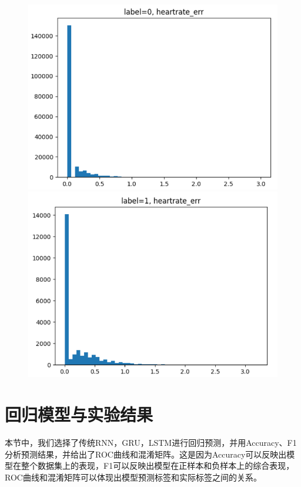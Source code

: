 \documentclass[UTF8]{article}
\begin{document}
\begin{figure}[h]
    \centering
    \begin{minipage}{.43\linewidth}
        \centering
        \includegraphics[width=\linewidth]{../err_0.png}
    \end{minipage}
    \begin{minipage}{.43\linewidth}
        \centering
        \includegraphics[width=\linewidth]{../err_1.png}
    \end{minipage}
\end{figure}

\section{回归模型与实验结果}
本节中，我们选择了传统RNN，GRU，LSTM进行回归预测，并用Accuracy、F1分析预测结果，并给出了ROC曲线和混淆矩阵。这是因为Accuracy可以反映出模型在整个数据集上的表现，F1可以反映出模型在正样本和负样本上的综合表现，ROC曲线和混淆矩阵可以体现出模型预测标签和实际标签之间的关系。
\end{document}
